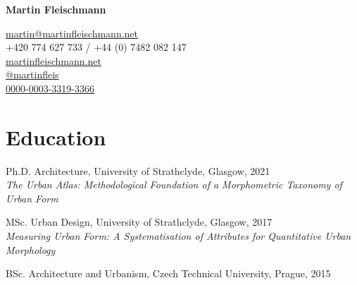 \documentclass[12pt,a4paper]{report}
\newcommand{\myname}{Martin Fleischmann}
\newcommand{\namefont}[1]{{\normalfont\bfseries\Huge{#1}}}
\begin{document}
    \raggedright{}

    \namefont{\myname}

    \vspace{1em}

    \begin{minipage}[t]{0.5\textwidth}
        \begin{flushleft}
        \end{flushleft}
    \end{minipage}%
    \begin{minipage}[t]{0.5\textwidth}
        \begin{flushright}
            \href{mailto:martin@martinfleischmann.net}{martin@martinfleischmann.net} \\
            +420 774 627 733 / +44 (0) 7482 082 147 \\
            \href{https://martinfleischmann.net}{martinfleischmann.net} \\
            \href{https://twitter.com/martinfleis}{@martinfleis} \\
            \href{https://orcid.org/0000-0003-3319-3366}{0000-0003-3319-3366}
        \end{flushright}
    \end{minipage}%


    \section*{Education}

    \begin{tablist}

        \item[Ph.D.] \tab{}Architecture, University of Strathclyde, Glasgow, 2021 \\
                           \textit{The Urban Atlas: Methodological Foundation of a Morphometric Taxonomy of Urban Form}
        \item[MSc.]  \tab{}Urban Design, University of Strathclyde, Glasgow, 2017 \\
                           \textit{Measuring Urban Form: A Systematisation of Attributes for Quantitative Urban Morphology}
        \item[BSc.]  \tab{}Architecture and Urbanism, Czech Technical University, Prague, 2015

    \end{tablist}
\end{document}
